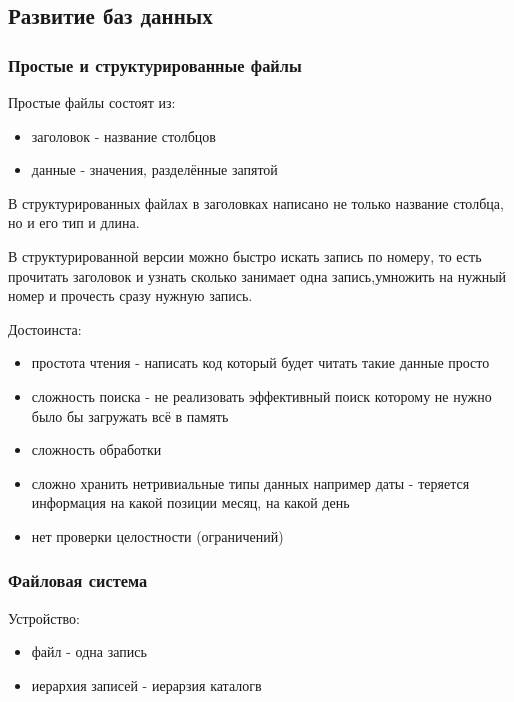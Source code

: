 \subsection{Развитие баз данных}
\subsubsection{Простые и структурированные файлы}
Простые файлы состоят из:
\begin{itemize}
    \item  заголовок - название столбцов
    \item  данные - значения, разделённые запятой
\end{itemize}
В структурированных файлах в заголовках написано не только название столбца, но и его тип
и длина.

\begin{remark}
В структурированной версии можно быстро искать запись по номеру, то есть прочитать
заголовок и узнать сколько занимает одна запись,умножить на нужный номер и прочесть
сразу нужную запись.
\end{remark}

Достоинста:
\begin{itemize}
    \item простота чтения - написать код который будет читать такие данные просто
\end{itemize}

\begin{itemize}
    \item сложность поиска - не реализовать эффективный поиск
которому не нужно было бы загружать всё в память
    \item сложность обработки
    \item сложно хранить нетривиальные типы данных
например даты - теряется информация на какой позиции месяц, на какой день
    \item нет проверки целостности  (ограничений)
\end{itemize}

\subsubsection{Файловая система}
Устройство:
\begin{itemize}
    \item файл - одна запись
    \item иерархия записей - иерарзия каталогв
\end{itemize}

